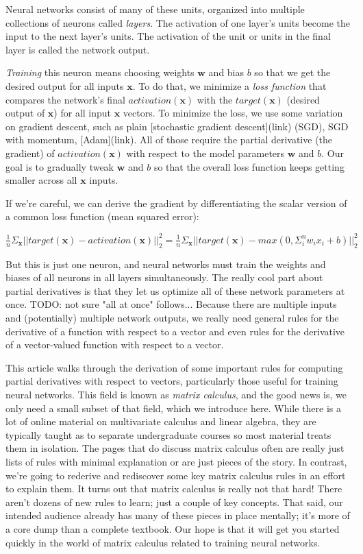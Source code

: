\documentclass[11pt]{article}
\begin{document}
Neural networks consist of many of these units, organized into multiple collections of neurons called {\em layers}. The activation of one layer's units become the input to the next layer's units. The activation of the unit or units in the final layer is called the network output.

{\em Training} this neuron means choosing weights $\mathbf{w}$ and bias $b$ so that we get the desired output for all inputs $\mathbf{x}$.  To do that, we minimize a {\em loss function} that compares the network's final $activation({\mathbf{x}})$ with the $target(\mathbf{x})$ (desired output of $\mathbf{x}$) for all input $\mathbf{x}$ vectors. To minimize the loss, we use some variation on gradient descent, such as plain [stochastic gradient descent](link) (SGD), SGD with momentum, [Adam](link).   All of those require the partial derivative (the gradient) of $activation({\mathbf{x}})$ with respect to the model parameters $\mathbf{w}$ and $b$. Our goal is to gradually tweak $\mathbf{w}$ and $b$ so that the overall loss function keeps getting smaller across all $\mathbf{x}$ inputs.

If we're careful, we can derive the gradient by differentiating the scalar version of a common loss function (mean squared error):

$\frac{1}{n} \Sigma_{\mathbf{x}} ||target(\mathbf{x}) - activation(\mathbf{x})||_2^2 = \frac{1}{n} \Sigma_{\mathbf{x}} ||target(\mathbf{x}) - max(0, \Sigma_i^n w_i x_i + b)||_2^2$

But this is just one neuron, and neural networks must train the weights and biases of all neurons in all layers simultaneously.  The really cool part about partial derivatives is that they let us optimize all of these network parameters at once. TODO: not sure "all at once" follows... Because there are multiple inputs and (potentially) multiple network outputs, we really need general rules for the derivative of a function with respect to a vector and even rules for the derivative of a vector-valued function with respect to a vector.

This article walks through the derivation of some important rules for computing partial derivatives with respect to vectors, particularly those useful for training neural networks. This field is known as {\em matrix calculus}, and the good news is, we only need a small subset of that field, which we introduce here.  While there is a lot of online material on multivariate calculus and linear algebra, they are typically taught as to separate undergraduate courses so most material treats them in isolation.  The pages that do discuss matrix calculus often are really just lists of rules with minimal explanation or are just pieces of the story.  In contrast, we're going to rederive and rediscover some key matrix calculus rules in an effort to explain them. It turns out that matrix calculus is really not that hard! There aren't dozens of new rules to learn; just a couple of key concepts.  That said, our intended audience already has many of these pieces in place mentally; it's more of a core dump than a complete textbook. Our hope is that it will get you started quickly in the world of matrix calculus related to training neural networks.
\end{document}
